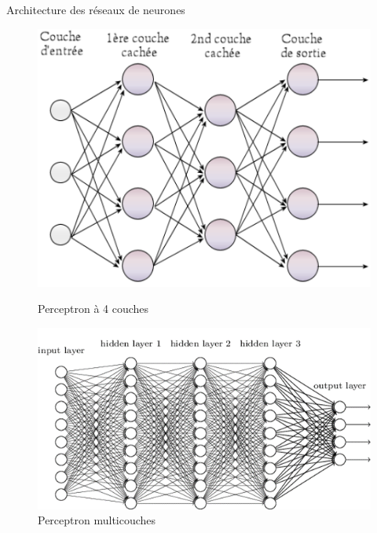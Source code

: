 \documentclass{beamer}
\begin{document}
\begin{frame}{Architecture des réseaux de neurones }
	\begin{figure}[h]
		\centering
		\begin{minipage}{0.5\textwidth}
			\centering
			\includegraphics[width=\linewidth]{Perceptron_4.png}
			\caption{Perceptron à 4 couches}
		\end{minipage}\hfill
		\begin{minipage}{0.5\textwidth}
			\centering
			\includegraphics[width=\linewidth]{Architecture-perceptron-multi-couches-1.png}
			\caption{Perceptron multicouches}
		\end{minipage}
	\end{figure}
\end{frame}	
\end{document}

